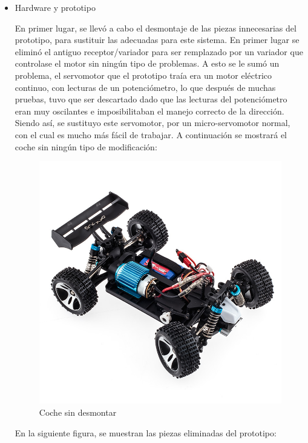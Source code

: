 \documentclass{pclass}
\begin{document}
\begin{itemize}

\item Hardware y prototipo

En primer lugar, se llevó a cabo el desmontaje de las piezas innecesarias del prototipo, para sustituir las adecuadas para este sistema. En primer lugar se eliminó el antiguo receptor/variador para ser remplazado por un variador que controlase el motor sin ningún tipo de problemas. A esto se le sumó un problema, el servomotor que el prototipo traía era un motor eléctrico continuo, con lecturas de un potenciómetro, lo que después de muchas pruebas, tuvo que ser descartado dado que las lecturas del potenciómetro eran muy oscilantes e imposibilitaban el manejo correcto de la dirección. Siendo así, se sustituyo este servomotor, por un micro-servomotor normal, con el cual es mucho más fácil de trabajar.
A continuación se mostrará el coche sin ningún tipo de modificación:

\begin{figure}[H]
  \centering
    \includegraphics[width=1\textwidth]{img/A959}
  \caption{Coche sin desmontar}
  \label{fig:CocheSin}
\end{figure}

En la siguiente figura, se muestran las piezas eliminadas del prototipo:


\end{itemize}
\end{document}
